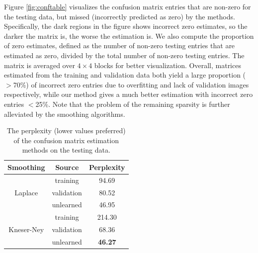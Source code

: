 Figure \ref{fig:conftable} visualizes the confusion matrix entries that are non-zero for the testing data, but missed (\ie incorrectly predicted as zero) by the methods. Specifically, the dark regions in the figure shows incorrect zero estimates, so the darker the matrix is, the worse the estimation is. We also compute the proportion of zero estimates, defined as the number of non-zero testing entries that are estimated as zero, divided by the total number of non-zero testing entries. The matrix is averaged over $4\times4$ blocks for better visualization. Overall, matrices estimated from the training and validation data both yield a large proportion ($>$70\%) of incorrect zero entries due to overfitting and lack of validation images respectively, while our method gives a much better estimation with incorrect zero entries $<$25\%. Note that the problem of the remaining sparsity is further alleviated by the smoothing algorithms.

\begin{table}
    \centering
    \begin{tabular}{c|c|c}
        \hline\hline
        Smoothing & Source & Perplexity\\
        \hline
                    & training      & 94.69 \\
        Laplace     & validation    & 80.52 \\
                    & unlearned     & 46.95 \\
        \hline
                    & training      & 214.30 \\
        Kneser-Ney  & validation    & 68.36 \\
                    & unlearned     & {\bfseries 46.27} \\
        \hline\hline
    \end{tabular}
    \caption{The perplexity (lower values preferred) of the confusion matrix estimation methods on the testing data.}
    \label{tab:perplexity}
\end{table}

